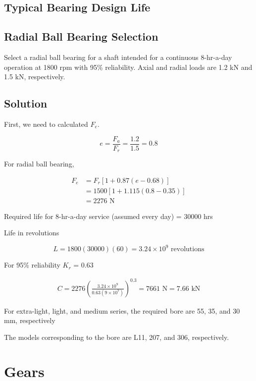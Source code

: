 \documentclass[a4paper,openany]{tufte-book}
\begin{document}
\section{Typical Bearing Design Life}
\label{sec:orge4e4234}


\section{Radial Ball Bearing Selection}
\label{sec:org905ddce}

Select a radial ball bearing for a shaft intended for a continuous
8-hr-a-day operation at 1800 rpm with 95\% reliability. Axial and radial
loads are 1.2 kN and 1.5 kN, respectively.

\section{Solution}
\label{sec:orgaf1d8fc}

First, we need to calculated \(F_e\).

\[e = \frac{F_a}{F_r} = \frac{1.2}{1.5} = 0.8\]

For radial ball bearing,

\begin{align}
  F_{e} &= F_r \left[ 1 + 0.87(e - 0.68) \right] \\
        &= 1500 \left[ 1 + 1.115(0.8 - 0.35) \right] \\
        &= 2276 \text{ N}
\end{align}

Required life for 8-hr-a-day service (assumed every day) = 30000 hrs

Life in revolutions

\[L = 1800(30000)(60) = 3.24 \times 10^9 \text{ revolutions}\]

For 95\% reliability \(K_r\) = 0.63

\begin{align}
    C = 2276 \left( \frac{3.24 \times 10^9}{0.63 (9 \times 10^7)} \right)^{0.3} = 7661 \text{ N} = 7.66 \text{ kN}
\end{align}

For extra-light, light, and medium series, the required bore are 55, 35,
and 30 mm, respectively

The models corresponding to the bore are L11, 207, and 306,
respectively.

\chapter{Gears}
\label{sec:org6c10ad7}
\end{document}
